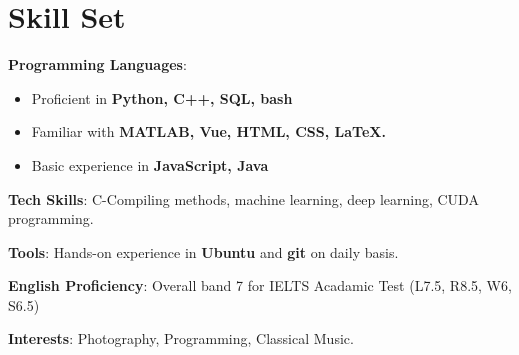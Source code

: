 \documentclass{chicv}
\begin{document}
\section{Skill Set}
\begin{compactlist}
  \item \textbf{Programming Languages}: 
  \begin{itemize}
    \item Proficient in \textbf{Python, C++, SQL, bash}
    \item Familiar with \textbf{MATLAB, Vue, HTML, CSS, \LaTeX.}
    \item Basic experience in \textbf{JavaScript, Java}
  \end{itemize}
  \item \textbf{Tech Skills}: C-Compiling methods, machine learning, deep learning, CUDA programming.
  \item \textbf{Tools}: Hands-on experience in \textbf{Ubuntu} and \textbf{git} on daily basis.
  \item \textbf{English Proficiency}: Overall band 7 for IELTS Acadamic Test (L7.5, R8.5, W6, S6.5)
  \item \textbf{Interests}: Photography, Programming, Classical Music.
\end{compactlist}
\end{document}
